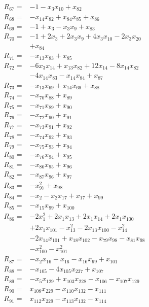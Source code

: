 \begin{align*}
R_{67}={}&-1 -x_{3}x_{10} +x_{82}\\[3pt]
R_{68}={}&-x_{14}x_{82} +x_{84}x_{85} +x_{86}\\[3pt]
R_{69}={}&-1 +x_{3} -x_{3}x_{9} +x_{83}\\[3pt]
R_{70}={}&-1 +2x_{3} +2x_{3}x_{9} +4x_{3}x_{10} -2x_{3}x_{20}\\
&+x_{84}\\[3pt]
R_{71}={}&-x_{13}x_{83} +x_{85}\\[3pt]
R_{72}={}&-6x_{3}x_{14} +x_{13}x_{82} +12x_{14} -8x_{14}x_{82}\\
&-4x_{14}x_{83} -x_{14}x_{84} +x_{87}\\[3pt]
R_{73}={}&-x_{13}x_{69} +x_{14}x_{69} +x_{88}\\[3pt]
R_{74}={}&-x_{70}x_{88} +x_{89}\\[3pt]
R_{75}={}&-x_{71}x_{89} +x_{90}\\[3pt]
R_{76}={}&-x_{72}x_{90} +x_{91}\\[3pt]
R_{77}={}&-x_{73}x_{91} +x_{92}\\[3pt]
R_{78}={}&-x_{74}x_{92} +x_{93}\\[3pt]
R_{79}={}&-x_{75}x_{93} +x_{94}\\[3pt]
R_{80}={}&-x_{76}x_{94} +x_{95}\\[3pt]
R_{81}={}&-x_{86}x_{95} +x_{96}\\[3pt]
R_{82}={}&-x_{87}x_{96} +x_{97}\\[3pt]
R_{83}={}&-x_{97}^{2} +x_{98}\\[3pt]
R_{84}={}&-x_{2} -x_{2}x_{17} +x_{17} +x_{99}\\[3pt]
R_{85}={}&-x_{15}x_{99} +x_{100}\\[3pt]
R_{86}={}&-2x_{1}^{2} +2x_{1}x_{13} +2x_{1}x_{14} +2x_{1}x_{100}\\
&+2x_{1}x_{101} -x_{13}^{2} -2x_{13}x_{100} -x_{14}^{2}\\
&-2x_{14}x_{101} +x_{18}x_{102} -x_{79}x_{98} -x_{81}x_{98}\\
&-x_{100}^{2} -x_{101}^{2}\\[3pt]
R_{87}={}&-x_{2}x_{16} +x_{16} -x_{16}x_{99} +x_{101}\\[3pt]
R_{88}={}&-x_{105} -4x_{105}x_{237} +x_{107}\\[3pt]
R_{89}={}&-x_{5}x_{129} +x_{103}x_{228} -x_{106} -x_{107}x_{129}\\[3pt]
R_{90}={}&x_{108}x_{229} -x_{110}x_{132} -x_{111}\\[3pt]
R_{91}={}&x_{112}x_{229} -x_{113}x_{132} -x_{114}\\[3pt]

\end{align*}

